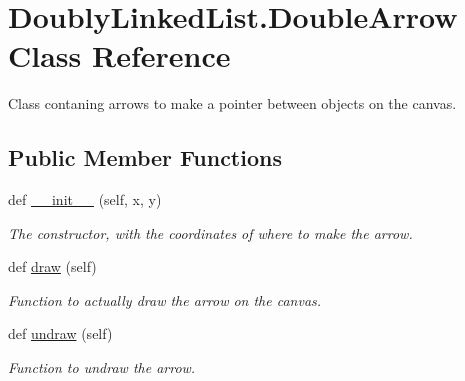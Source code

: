 \hypertarget{class_doubly_linked_list_1_1_double_arrow}{}\section{Doubly\+Linked\+List.\+Double\+Arrow Class Reference}
\label{class_doubly_linked_list_1_1_double_arrow}


Class contaning arrows to make a pointer between objects on the canvas.  


\subsection*{Public Member Functions}
\begin{DoxyCompactItemize}
\item 
\mbox{\label{class_doubly_linked_list_1_1_double_arrow_ae06f535b0f52f368b6f204d70a65b12c}} 
def \hyperlink{class_doubly_linked_list_1_1_double_arrow_ae06f535b0f52f368b6f204d70a65b12c}{\+\_\+\+\_\+init\+\_\+\+\_\+} (self, x, y)
\begin{DoxyCompactList}\small\item\em The constructor, with the coordinates of where to make the arrow. \end{DoxyCompactList}\item 
\mbox{\label{class_doubly_linked_list_1_1_double_arrow_acfa0817a0b046114eaa38726779b70cd}} 
def \hyperlink{class_doubly_linked_list_1_1_double_arrow_acfa0817a0b046114eaa38726779b70cd}{draw} (self)
\begin{DoxyCompactList}\small\item\em Function to actually draw the arrow on the canvas. \end{DoxyCompactList}\item 
\mbox{\label{class_doubly_linked_list_1_1_double_arrow_ad1bc1862d04ba57d448acea20ee34e0e}} 
def \hyperlink{class_doubly_linked_list_1_1_double_arrow_ad1bc1862d04ba57d448acea20ee34e0e}{undraw} (self)
\begin{DoxyCompactList}\small\item\em Function to undraw the arrow. \end{DoxyCompactList}\item 
\mbox{\label{class_doubly_linked_list_1_1_double_arrow_ad116df463a063a94e2319496399cbb71}} 

\end{DoxyCompactItemize}
